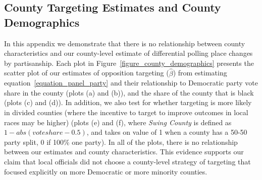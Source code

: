 \documentclass[12pt]{article}
\begin{document}
\clearpage \newpage
\subsection{County Targeting Estimates and County Demographics}\label{appendix_countytargetinganddemographics}
\setcounter{table}{0}
\setcounter{figure}{0}
\renewcommand{\thetable}{F\arabic{table}}
\renewcommand{\thefigure}{F\arabic{figure}}

In this appendix we demonstrate that there is no relationship between county characteristics and our county-level estimate of differential polling place changes by partisanship.  Each plot in Figure~\ref{figure_county_demographics} presents the scatter plot of our estimates of opposition targeting ($\hat{\beta}$) from estimating equation~\ref{equation_panel_party} and their relationship to Democratic party vote share in the county (plots (a) and (b)), and the share of the county that is black (plots (c) and (d)). In addition, we also test for whether targeting is more likely in divided counties (where the incentive to target to improve outcomes in local races may be higher) (plots (e) and (f), where \emph{Swing County} is defined as $1 - abs(vote share - 0.5)$, and takes on value of 1 when a county has a 50-50 party split, 0 if 100\% one party).  In all of the plots, there is no relationship between our estimates and county characteristics.  This evidence supports our claim that local officials did not choose a county-level strategy of targeting that focused explicitly on more Democratic or more minority counties.
\end{document}

